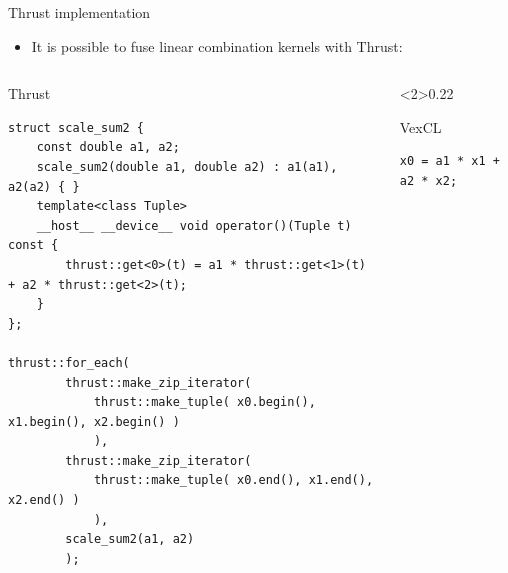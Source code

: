 \documentclass[@BEAMER_OPTIONS@]{beamer}
\begin{document}
\begin{frame}[fragile]{Thrust implementation}
    \begin{itemize}
        \item It is possible to fuse linear combination kernels with Thrust:
    \end{itemize}
    \begin{columns}
        \begin{column}{0.70\textwidth}
            \begin{exampleblock}{Thrust}
                \begin{adjustbox}{width=0.95\textwidth,height=0.6\textheight,keepaspectratio}
                    \begin{lstlisting}
struct scale_sum2 {
    const double a1, a2;
    scale_sum2(double a1, double a2) : a1(a1), a2(a2) { }
    template<class Tuple>
    __host__ __device__ void operator()(Tuple t) const {
        thrust::get<0>(t) = a1 * thrust::get<1>(t) + a2 * thrust::get<2>(t);
    }
};

thrust::for_each(
        thrust::make_zip_iterator(
            thrust::make_tuple( x0.begin(), x1.begin(), x2.begin() )
            ),
        thrust::make_zip_iterator(
            thrust::make_tuple( x0.end(), x1.end(), x2.end() )
            ),
        scale_sum2(a1, a2)
        );
                    \end{lstlisting}
                \end{adjustbox}
            \end{exampleblock}
        \end{column}
        \begin{column}<2>{0.22\textwidth}
            \begin{exampleblock}{VexCL}
                \begin{adjustbox}{width=0.95\textwidth,height=0.6\textheight,keepaspectratio}
                    \begin{lstlisting}
x0 = a1 * x1 + a2 * x2;
                    \end{lstlisting}
                \end{adjustbox}
            \end{exampleblock}
        \end{column}
    \end{columns}
\end{frame}
\end{document}
